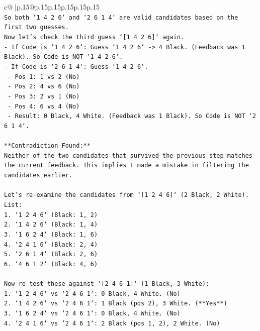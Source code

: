 \documentclass{article}
\begin{document}
{\begin{supertabular}{c@{$\;$}|p{.15\linewidth}@{}p{.15\linewidth}p{.15\linewidth}p{.15\linewidth}p{.15\linewidth}p{.15\linewidth}}
{{{\\ 
\texttt{So both `1 4 2 6` and `2 6 1 4` are valid candidates based on the first two guesses.} \\
\texttt{Now let's check the third guess `{[}1 4 2 6{]}` again.} \\
\texttt{{-} If Code is `1 4 2 6`: Guess `1 4 2 6` {-}> 4 Black. (Feedback was 1 Black). So Code is NOT `1 4 2 6`.} \\
\texttt{{-} If Code is `2 6 1 4`: Guess `1 4 2 6`.} \\
\texttt{  {-} Pos 1: 1 vs 2 (No)} \\
\texttt{  {-} Pos 2: 4 vs 6 (No)} \\
\texttt{  {-} Pos 3: 2 vs 1 (No)} \\
\texttt{  {-} Pos 4: 6 vs 4 (No)} \\
\texttt{  {-} Result: 0 Black, 4 White. (Feedback was 1 Black). So Code is NOT `2 6 1 4`.} \\
\\ 
\texttt{**Contradiction Found:**} \\
\texttt{Neither of the two candidates that survived the previous step matches the current feedback. This implies I made a mistake in filtering the candidates earlier.} \\
\\ 
\texttt{Let's re{-}examine the candidates from `{[}1 2 4 6{]}` (2 Black, 2 White).} \\
\texttt{List:} \\
\texttt{1. `1 2 4 6` (Black: 1, 2)} \\
\texttt{2. `1 4 2 6` (Black: 1, 4)} \\
\texttt{3. `1 6 2 4` (Black: 1, 6)} \\
\texttt{4. `2 4 1 6` (Black: 2, 4)} \\
\texttt{5. `2 6 1 4` (Black: 2, 6)} \\
\texttt{6. `4 6 1 2` (Black: 4, 6)} \\
\\ 
\texttt{Now re{-}test these against `{[}2 4 6 1{]}` (1 Black, 3 White):} \\
\texttt{1. `1 2 4 6` vs `2 4 6 1`: 0 Black, 4 White. (No)} \\
\texttt{2. `1 4 2 6` vs `2 4 6 1`: 1 Black (pos 2), 3 White. (**Yes**)} \\
\texttt{3. `1 6 2 4` vs `2 4 6 1`: 0 Black, 4 White. (No)} \\
\texttt{4. `2 4 1 6` vs `2 4 6 1`: 2 Black (pos 1, 2), 2 White. (No)} \\
}}}
\end{supertabular}}
\end{document}
